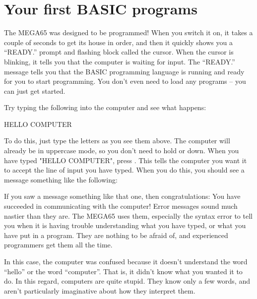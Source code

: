 \section{Your first BASIC programs}

The MEGA65 was designed to be programmed! When you switch it on,
it takes a couple of seconds to get its house in order, and then
it quickly shows you a ``READY.'' prompt and flashing block called
the cursor.  When the cursor is blinking, it tells you that the
computer is waiting for input.  The ``READY.'' message tells you
that the BASIC programming language is running and ready for you to
start programming.  You don't even need to load any programs --
you can just get started.

\needspace{4cm} %
Try typing the following into the computer and see what happens:

\begin{screencode}
HELLO COMPUTER
\end{screencode}

\needspace{4cm} %

To do this, just type the letters as you see them above.  The computer
will already be in uppercase mode, so you don't need to hold 
or  down.  When you have typed "HELLO COMPUTER", press
  .  This tells the computer you want it to accept the
  line of input you have typed.  When you do this, you should see a message something
  like the following:


  If you saw a  message something like that one, then congratulations:
  You have succeeded in communicating with the computer!
  Error messages sound much nastier than they are.  The MEGA65 uses them, especially
  the syntax error to tell you when it is having trouble understanding what you have
  typed, or what you have put in a program.  They are nothing to be afraid of, and
  experienced programmers get them all the time.

  In this case, the computer was confused because it doesn't understand the word
  ``hello'' or the word ``computer''.  That is, it didn't know what you wanted it to
  do.  In this regard, computers are quite stupid. They know only a few words, and
  aren't particularly imaginative about how they interpret them.

